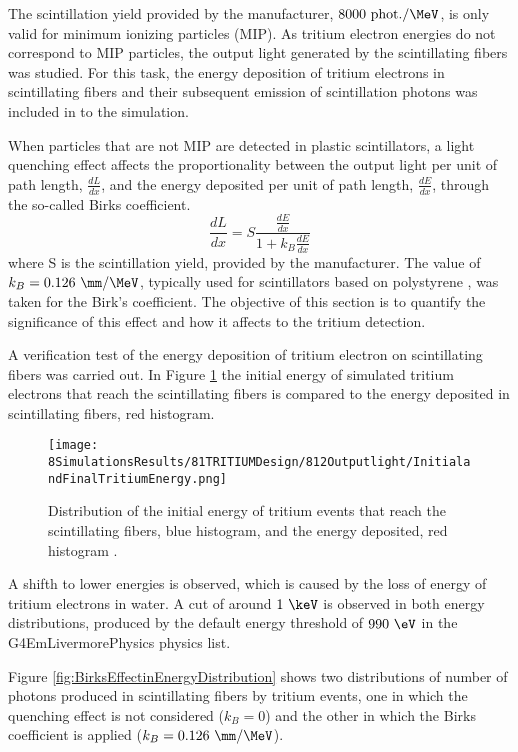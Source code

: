 The scintillation yield provided by the manufacturer, $8000~\text{phot.}/\MeV$, is only valid for minimum ionizing particles (MIP). As tritium electron energies do not correspond to MIP particles, the output light generated by the scintillating fibers was studied. For this task, the energy deposition of tritium electrons in scintillating fibers and their subsequent emission of scintillation photons was included in to the simulation.

When particles that are not MIP are detected in plastic scintillators, a light quenching effect affects the proportionality between the output light per unit of path length, $\frac{dL}{dx}$, and the energy deposited per unit of path length, $\frac{dE}{dx}$, through the so-called Birks coefficient\cite{BirksPaper}.
\begin{equation}
\frac{dL}{dx}= S\frac{\displaystyle{\frac{dE}{dx}}}{1+k_B\displaystyle{\frac{dE}{dx}}}
\label{eq:birkscoefficient}
\end{equation}
where S is the scintillation yield, provided by the manufacturer. The value of $k_B=0.126~\mm/\MeV$, typically used for scintillators based on polystyrene \cite{BirksCoefficient}, was taken for the Birk's coefficient. The objective of this section is to quantify the significance of this effect and how it affects to the tritium detection.

A verification test of the energy deposition of tritium electron on scintillating fibers was carried out. In Figure \ref{fig:InitialFinalTritiumEnergy} the initial energy of simulated tritium electrons that reach the scintillating fibers is compared to the energy deposited in scintillating fibers, red histogram.

\begin{figure}[h]
\centering
\texttt{[image: 8SimulationsResults/81TRITIUMDesign/812Outputlight/InitialandFinalTritiumEnergy.png]}
\caption{Distribution of the initial energy of tritium events that reach the scintillating fibers, blue histogram, and the energy deposited, red histogram \cite{SimulationPaperCarlos}.\label{fig:InitialFinalTritiumEnergy}}
\end{figure}

A shifth to lower energies is observed, which is caused by the loss of energy of tritium electrons in water. A cut of around $1~\keV$ is observed in both energy distributions, produced by the default energy threshold of $990~\eV$ in the G4EmLivermorePhysics physics list.

Figure \ref{fig:BirksEffectinEnergyDistribution} shows two distributions of number of photons produced in scintillating fibers by tritium events, one in which the quenching effect is not considered ($k_B=0$) and the other in which the Birks coefficient is applied ($k_B=0.126~\mm/\MeV$).

